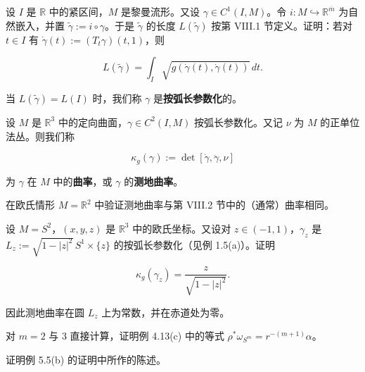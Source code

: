 \begin{exercises}
\item

设 $ I $ 是 $ \mathbb{R} $ 中的紧区间，$ M $ 是黎曼流形。又设 $ \gamma \in C^{1}(I, M) $。令 $ i : M \hookrightarrow \mathbb{R}^{\overline{m}} $ 为自然嵌入，并置 $ \widetilde{\gamma} := i \circ \gamma $。于是 $ \widetilde{\gamma} $ 的长度 $ L(\widetilde{\gamma}) $ 按第 VIII.1 节定义。证明：若对 $ t \in I $ 有 $ \dot{\gamma}(t) := (T_{t}\gamma)(t, 1) $，则

\[
L(\widetilde{\gamma}) = \int_{I} \sqrt{g(\dot{\gamma}(t), \dot{\gamma}(t))} \, dt .
\]

当 $ L(\widetilde{\gamma}) = L(I) $ 时，我们称 $ \gamma $ 是\textbf{按弧长参数化}的。

\item

设 $ M $ 是 $ \mathbb{R}^{3} $ 中的定向曲面，$ \gamma \in C^{2}(I, M) $ 按弧长参数化。又记 $ \nu $ 为 $ M $ 的正单位法丛。则我们称

\[
\kappa_{g}(\gamma) := \det[\dot{\gamma}, \ddot{\gamma}, \nu]
\]

为 $ \gamma $ 在 $ M $ 中的\textbf{曲率}，或 $ \gamma $ 的\textbf{测地曲率}。

\begin{items}
\item

在欧氏情形 $ M = \mathbb{R}^{2} $ 中验证测地曲率与第 VIII.2 节中的（通常）曲率相同。

\item

设 $ M = S^{2} $，$ (x, y, z) $ 是 $ \mathbb{R}^{3} $ 中的欧氏坐标。又设对 $ z \in (-1, 1) $，$ \gamma_{z} $ 是 $ L_{z} := \sqrt{1 - |z|^{2}}\, S^{1} \times \{z\} $ 的按弧长参数化（见例 1.5(a)）。证明

\[
\kappa_{g}(\gamma_{z}) = \frac{z}{\sqrt{1 - |z|^{2}}} .
\]

因此测地曲率在圆 $ L_{z} $ 上为常数，并在赤道处为零。

\end{items}

\item

对 $ m = 2 $ 与 $ 3 $ 直接计算，证明例 4.13(c) 中的等式 $ \rho^{\ast}\omega_{S^{m}} = r^{-(m+1)}\alpha $。

\item

证明例 5.5(b) 的证明中所作的陈述。

\item


\end{exercises}
